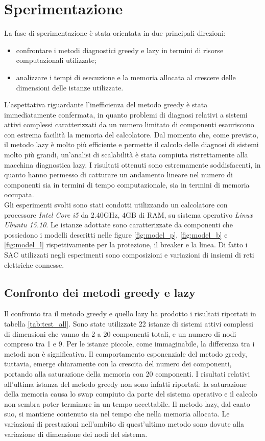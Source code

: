 \chapter{Sperimentazione}
La fase di sperimentazione è stata orientata in due principali direzioni:
\begin{itemize}
\item confrontare i metodi diagnostici greedy e lazy in termini di risorse computazionali utilizzate;
\item analizzare i tempi di esecuzione e la memoria allocata al crescere delle dimensioni delle istanze utilizzate.
\end{itemize} 
L'aspettativa riguardante l'inefficienza del metodo greedy è stata immediatamente confermata, in quanto problemi di diagnosi relativi a sistemi attivi complessi caratterizzati da un numero limitato di componenti esauriscono con estrema facilità la memoria del calcolatore. 
Dal momento che, come previsto, il metodo lazy è molto più efficiente e permette il calcolo delle diagnosi di sistemi molto più grandi, un'analisi di scalabilità è stata compiuta ristrettamente alla macchina diagnostica lazy.
I risultati ottenuti sono estremamente soddisfacenti, in quanto hanno permesso di catturare un andamento lineare nel numero di componenti sia in termini di tempo computazionale, sia in termini di memoria occupata.\\
Gli esperimenti svolti sono stati condotti utilizzando un calcolatore con processore \emph{Intel Core i5} da 2.40GHz, 4GB di RAM, su sistema operativo \emph{Linux Ubuntu 15.10}.
Le istanze adottate sono caratterizzate da componenti che possiedono i modelli descritti nelle figure \ref{fig:model_p}, \ref{fig:model_b} e \ref{fig:model_l} rispettivamente per la protezione, il breaker e la linea. Di fatto i SAC utilizzati negli esperimenti sono composizioni e variazioni di insiemi di reti elettriche connesse.

\section{Confronto dei metodi greedy e lazy}
Il confronto tra il metodo greedy e quello lazy ha prodotto i risultati riportati in tabella \ref{tab:test_all}. Sono state utilizzate 22 istanze di sistemi attivi complessi di dimensioni che vanno da 2 a 20 componenti totali, e un numero di nodi compreso tra 1 e 9. Per le istanze piccole, come immaginabile, la differenza tra i metodi non è significativa. Il comportamento esponenziale del metodo greedy, tuttavia, emerge chiaramente con la crescita del numero dei componenti, portando alla saturazione della memoria con 20 componenti. I risultati relativi all'ultima istanza del metodo greedy non sono infatti riportati: la saturazione della memoria causa lo swap compiuto da parte del sistema operativo e il calcolo non sembra poter terminare in un tempo accettabile. Il metodo lazy, dal canto suo, si mantiene contenuto sia nel tempo che nella memoria allocata. Le variazioni di prestazioni nell'ambito di quest'ultimo metodo sono dovute alla variazione di dimensione dei nodi del sistema. 

